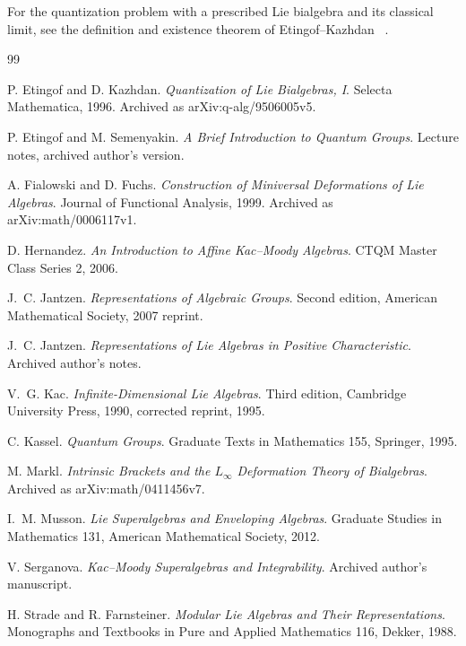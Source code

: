 \documentclass[11pt,oneside,openany]{book}
\newcommand{\runningchapter}{}
\theoremstyle{definition}
\theoremstyle{remark}
\begin{document}
For the quantization problem with a prescribed Lie bialgebra
and its classical limit, see the definition and existence
theorem of Etingof--Kazhdan
~\cite[Section 3 and Theorem 9.6]{etingof-kazhdan}.
\backmatter
\begingroup
\footnotesize
\begin{thebibliography}{99}
{}
\renewcommand{\runningchapter}{Bibliography}
\setlength{\itemsep}{2pt}

P. Etingof and D. Kazhdan.
\emph{Quantization of Lie Bialgebras, I}.
Selecta Mathematica, 1996. Archived as arXiv:q-alg/9506005v5.

P. Etingof and M. Semenyakin.
\emph{A Brief Introduction to Quantum Groups}.
Lecture notes, archived author's version.

A. Fialowski and D. Fuchs.
\emph{Construction of Miniversal Deformations of Lie Algebras}.
Journal of Functional Analysis, 1999. Archived as arXiv:math/0006117v1.

D. Hernandez.
\emph{An Introduction to Affine Kac--Moody Algebras}.
CTQM Master Class Series 2, 2006.

J.~C. Jantzen.
\emph{Representations of Algebraic Groups}.
Second edition, American Mathematical Society, 2007 reprint.

J.~C. Jantzen.
\emph{Representations of Lie Algebras in Positive Characteristic}.
Archived author's notes.

V.~G. Kac.
\emph{Infinite-Dimensional Lie Algebras}.
Third edition, Cambridge University Press, 1990, corrected reprint, 1995.

C. Kassel.
\emph{Quantum Groups}.
Graduate Texts in Mathematics 155, Springer, 1995.

M. Markl.
\emph{Intrinsic Brackets and the \(L_\infty\) Deformation Theory of Bialgebras}.
Archived as arXiv:math/0411456v7.

I.~M. Musson.
\emph{Lie Superalgebras and Enveloping Algebras}.
Graduate Studies in Mathematics 131, American Mathematical Society, 2012.

V. Serganova.
\emph{Kac--Moody Superalgebras and Integrability}.
Archived author's manuscript.

H. Strade and R. Farnsteiner.
\emph{Modular Lie Algebras and Their Representations}.
Monographs and Textbooks in Pure and Applied Mathematics 116, Dekker, 1988.


\end{thebibliography}
\end{document}

